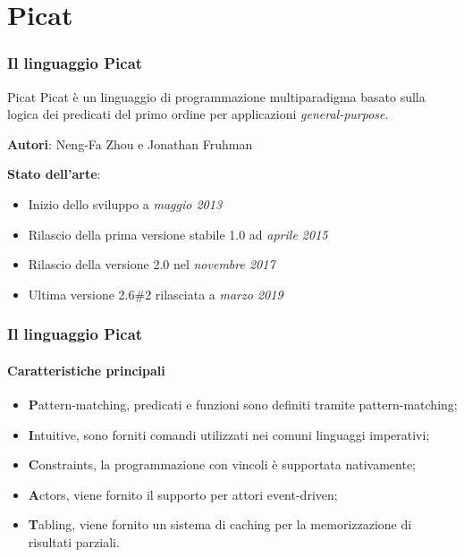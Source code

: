 \documentclass{beamer}
\begin{document}
\section{Picat}

\begin{frame}
  \frametitle{Il linguaggio Picat}
  \begin{block}{Picat}
    Picat è un linguaggio di programmazione multiparadigma basato
    sulla logica dei predicati del primo ordine per applicazioni
    \emph{general-purpose}.
  \end{block}

  \medskip

  \textbf{Autori}: Neng-Fa Zhou e Jonathan Fruhman
  
  \textbf{Stato dell'arte}:
  \begin{itemize}
  \item Inizio dello sviluppo a \emph{maggio 2013}
  \item Rilascio della prima versione stabile 1.0 ad \emph{aprile
    2015}
  \item Rilascio della versione 2.0 nel \emph{novembre 2017}
  \item Ultima versione 2.6\#2 rilasciata a \emph{marzo 2019}
  \end{itemize}
\end{frame}

\begin{frame}
  \frametitle{Il linguaggio Picat} \framesubtitle{Caratteristiche
    principali}
  \begin{itemize}
  \item \textbf{P}attern-matching, predicati e funzioni sono definiti
    tramite pattern-matching;
  \item \textbf{I}ntuitive, sono forniti comandi utilizzati nei comuni
    linguaggi imperativi;
  \item \textbf{C}onstraints, la programmazione con vincoli è
    supportata nativamente;
  \item \textbf{A}ctors, viene fornito il supporto per attori
    event-driven;
  \item \textbf{T}abling, viene fornito un sistema di caching per la
    memorizzazione di risultati parziali.
  \end{itemize}
\end{frame}

\end{document}
